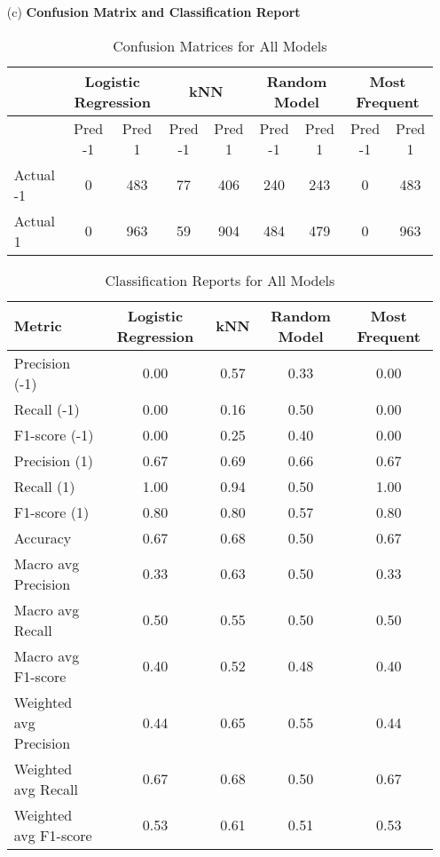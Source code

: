 \documentclass[a4paper,10pt]{article}
\begin{document}
\begin{enumerate}
\item[(c)] \textbf{Confusion Matrix and Classification Report} \\
\begin{table}[ht]
    \centering
    \caption{Confusion Matrices for All Models}
    \begin{tabular}{l|cc|cc|cc|cc}
        \hline
        & \multicolumn{2}{c|}{Logistic Regression} & \multicolumn{2}{c|}{kNN} & \multicolumn{2}{c|}{Random Model} & \multicolumn{2}{c}{Most Frequent} \\
        \hline
        & Pred -1 & Pred 1 & Pred -1 & Pred 1 & Pred -1 & Pred 1 & Pred -1 & Pred 1 \\
        \hline
        Actual -1 & 0 & 483 & 77 & 406 & 240 & 243 & 0 & 483 \\
        Actual 1  & 0 & 963 & 59 & 904 & 484 & 479 & 0 & 963 \\
        \hline
    \end{tabular}
    \label{tab:confusion_matrices}
\end{table}
\begin{table}[ht]
    \centering
    \caption{Classification Reports for All Models}
    \begin{tabular}{l|c|c|c|c}
        \hline
        Metric & Logistic Regression & kNN & Random Model & Most Frequent \\
        \hline
        Precision (-1) & 0.00 & 0.57 & 0.33 & 0.00 \\
        Recall (-1)    & 0.00 & 0.16 & 0.50 & 0.00 \\
        F1-score (-1)  & 0.00 & 0.25 & 0.40 & 0.00 \\
        Precision (1)  & 0.67 & 0.69 & 0.66 & 0.67 \\
        Recall (1)     & 1.00 & 0.94 & 0.50 & 1.00 \\
        F1-score (1)   & 0.80 & 0.80 & 0.57 & 0.80 \\
        Accuracy       & 0.67 & 0.68 & 0.50 & 0.67 \\
        Macro avg Precision & 0.33 & 0.63 & 0.50 & 0.33 \\
        Macro avg Recall    & 0.50 & 0.55 & 0.50 & 0.50 \\
        Macro avg F1-score  & 0.40 & 0.52 & 0.48 & 0.40 \\
        Weighted avg Precision & 0.44 & 0.65 & 0.55 & 0.44 \\
        Weighted avg Recall    & 0.67 & 0.68 & 0.50 & 0.67 \\
        Weighted avg F1-score  & 0.53 & 0.61 & 0.51 & 0.53 \\
        \hline
    \end{tabular}
    \label{tab:classification_reports}
\end{table} \\


\end{enumerate}
\end{document}
